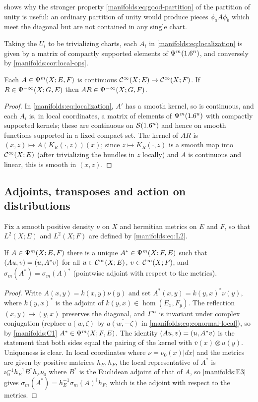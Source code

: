  shows why the stronger property
\eqref{manifolds:eq:good-partition} of the partition of unity is useful: an
ordinary partition of unity would produce pieces $\phi_aA\phi_b$ which meet the
diagonal but are not contained in any single chart.

Taking the $U_i$ to be trivializing charts, each $A_i$ in
\eqref{manifolds:eq:localization} is given by a matrix of compactly supported
elements of $\Psi^{m}(1.6^n)$, and conversely by \cref{manifolds:cor:local-ops}.

\begin{proposition}\label{manifolds:prop:continuity}
Each $A\in\Psi^{m}(X;E,F)$ is continuous $\mathcal{C}^\infty(X;E)\to\mathcal{C}^\infty(X;F)$. If
$R\in\Psi^{-\infty}(X;G,E)$ then $AR\in\Psi^{-\infty}(X;G,F)$.
\end{proposition}
\begin{proof}
In \eqref{manifolds:eq:localization}, $A'$ has a smooth kernel, so is continuous,
and each $A_i$ is, in local coordinates, a matrix of elements of $\Psi^{m}(1.6^n)$
with compactly supported kernels; these are continuous on $\mathcal{S}(1.6^n)$ and hence on
smooth functions supported in a fixed compact set. The kernel of $AR$ is
$(x,z)\mapsto A(K_R(\cdot,z))(x)$; since $z\mapsto K_R(\cdot,z)$ is a smooth map into
$\mathcal{C}^\infty(X;E)$ (after trivializing the bundles in $z$ locally) and $A$ is continuous and
linear, this is smooth in $(x,z)$.
\end{proof}

\subsection{Adjoints, transposes and action on distributions}
Fix a smooth positive density $\nu$ on $X$ and hermitian metrics on $E$ and $F$,
so that $L^2(X;E)$ and $L^2(X;F)$ are defined by \eqref{manifolds:eq:L2}.

\begin{proposition}\label{manifolds:prop:adjoint}
If $A\in\Psi^{m}(X;E,F)$ there is a unique $A^*\in\Psi^{m}(X;F,E)$ such that
$( Au, v)=( u, A^*v)$ for all $u\in\mathcal{C}^\infty(X;E)$, $v\in\mathcal{C}^\infty(X;F)$, and
$\sigma_m(A^*)=\sigma_m(A)^*$ (pointwise adjoint with respect to the metrics).
\end{proposition}
\begin{proof}
Write $A(x,y)=k(x,y)\nu(y)$ and set $A^*(x,y)=k(y,x)^*\nu(y)$, where $k(y,x)^*$ is
the adjoint of $k(y,x)\in\hom(E_x,F_y)$. The reflection $(x,y)\mapsto(y,x)$
preserves the diagonal, and $I^{m}$ is invariant under complex conjugation
(replace $a(w,\zeta)$ by $\overline{a(w,-\zeta)}$ in \eqref{manifolds:eq:conormal-local}),
so by \ref{manifolds:C1} $A^*\in\Psi^{m}(X;F,E)$. The identity
$( Au, v)=( u, A^*v)$ is the statement that both sides equal the pairing of
the kernel with $\overline{v}(x)\otimes u(y)$. Uniqueness is clear. In local
coordinates where $\nu=\nu_0(x)|dx|$ and the metrics are given by positive matrices
$h_E,h_F$, the local representative of $A^*$ is $\nu_0^{-1}h_E^{-1}B^*h_F\nu_0$ where
$B^*$ is the Euclidean adjoint of that of $A$, so \ref{manifolds:E3} gives
$\sigma_m(A^*)=h_E^{-1}\sigma_m(A)^{\dagger}h_F$, which is the adjoint with respect to the
metrics.
\end{proof}

